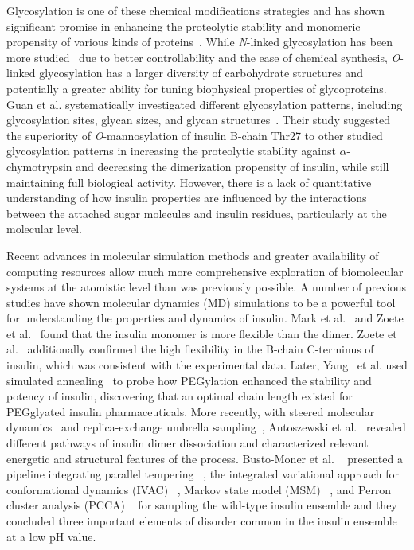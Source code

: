\documentclass[sn-vancouver]{sn-jnl}
\begin{document}
Glycosylation is one of these chemical modifications strategies and has shown significant promise in enhancing the proteolytic stability and monomeric propensity of various kinds of proteins~\cite{kayser2011glycosylation, raju2006glycosylation,russell2009site}. While \emph{N}-linked glycosylation has been more studied~\cite{losev2019novel,van2004role, sareneva1995n} due to better controllability and the ease of chemical synthesis, \emph{O}-linked glycosylation has a larger diversity of carbohydrate structures and potentially a greater ability for tuning biophysical properties of glycoproteins. Guan et al. systematically investigated different glycosylation patterns, including glycosylation sites, glycan sizes, and glycan structures~\cite{guan2018chemically}. Their study suggested the superiority of \emph{O}-mannosylation of insulin B-chain Thr27 to other studied glycosylation patterns in increasing the proteolytic stability against $\alpha$-chymotrypsin and decreasing the dimerization propensity of insulin, while still maintaining full biological activity. However, there is a lack of quantitative understanding of how insulin properties are influenced by the interactions between the attached sugar molecules and insulin residues, particularly at the molecular level. 

Recent advances in molecular simulation methods and greater availability of computing resources allow much more comprehensive exploration of biomolecular systems at the atomistic level than was previously possible. A number of previous studies have shown molecular dynamics (MD) simulations to be a powerful tool for understanding the properties and dynamics of insulin. Mark et al.~\cite{mark1991conformational} and Zoete et al.~\cite{zoete2004comparison} found that the insulin monomer is more flexible than the dimer. Zoete et al.~\cite{zoete2004comparison} additionally confirmed the high flexibility in the B-chain C-terminus of insulin, which was consistent with the experimental data. Later, Yang~\cite{yang2011pegylation} et al. used simulated annealing~\cite{pincus1970letter} to probe how PEGylation enhanced the stability and potency of insulin, discovering that an optimal chain length existed for PEGglyated insulin pharmaceuticals. More recently, with steered molecular dynamics~\cite{isralewitz2001steered} and replica-exchange umbrella sampling~\cite{sugita2000multidimensional}, Antoszewski et al.~\cite{antoszewski2020insulin} revealed different pathways of insulin dimer dissociation and characterized relevant energetic and structural features of the process. Busto-Moner et al. ~\cite{busto2021structural} presented a pipeline integrating parallel tempering ~\cite{hansmann1997parallel, earl2005parallel}, the integrated variational approach for conformational dynamics (IVAC) ~\cite{nuske2014variational, lorpaiboon2020integrated}, Markov state model (MSM) ~\cite{prinz2011markov, bowman2013introduction}, and Perron cluster analysis (PCCA) ~\cite{schutte1999direct} for sampling the wild-type insulin ensemble and they concluded three important elements of disorder common in the insulin ensemble at a low pH value.
\end{document}

